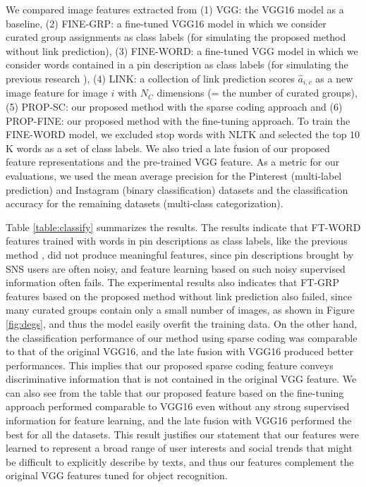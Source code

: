 \documentclass[letterpaper]{article} %
\begin{document}
We compared image features extracted from
(1) VGG: the VGG16 model as a baseline,
(2) FINE-GRP: a fine-tuned VGG16 model in which we consider curated group assignments as class labels (for simulating the proposed method without link prediction),
(3) FINE-WORD: a fine-tuned VGG model in which we consider words contained in a pin description as class labels (for simulating the previous research \cite{Joulin2016}),
(4) LINK: a collection of link prediction scores $\hat{a}_{i,c}$ as a new image feature for image $i$ with $N_C$ dimensions (= the number of curated groups),
(5) PROP-SC: our proposed method with the sparse coding approach and
(6) PROP-FINE: our proposed method with the fine-tuning approach.
%
To train the FINE-WORD model, we excluded stop words with NLTK and selected the top $10$K words as a set of class labels.
%
We also tried a late fusion of our proposed feature representations and the pre-trained VGG feature.
%
As a metric for our evaluations, we used the mean average precision for the Pinterest (multi-label prediction) and Instagram (binary classification) datasets and the classification accuracy for the remaining datasets (multi-class categorization).

Table \ref{table:classify} summarizes the results.
%
The results indicate that FT-WORD features trained with words in pin descriptions as class labels, like the previous method \cite{Joulin2016}, did not produce meaningful features, since pin descriptions brought by SNS users are often noisy, and feature learning based on such noisy supervised information often fails.
%
The experimental results also indicates that FT-GRP features based on the proposed method without link prediction also failed, since many curated groups contain only a small number of images, as shown in Figure \ref{fig:degs}, and thus the model easily overfit the training data.
%
On the other hand, the classification performance of our method using sparse coding was comparable to that of the original VGG16, and the late fusion with VGG16 produced better performances.
%
This implies that our proposed sparse coding feature conveys discriminative information that is not contained in the original VGG feature.
%
We can also see from the table that our proposed feature based on the fine-tuning approach performed comparable to VGG16 even without any strong supervised information for feature learning, and the late fusion with VGG16 performed the best for all the datasets.
%
This result justifies our statement that our features were learned to represent a broad range of user interests and social trends that might be difficult to explicitly describe by texts, and thus our features complement the original VGG features tuned for object recognition.
\end{document}
